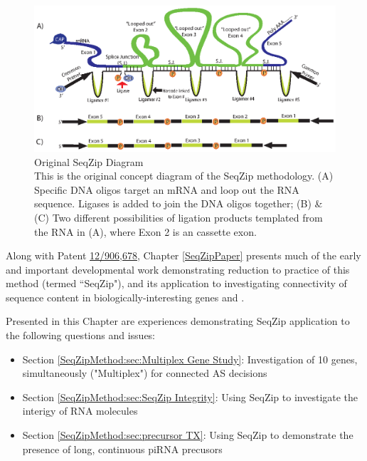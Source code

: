   \begin{figure} %
    \centering 
    \includegraphics{Figures/SeqZipMethod/OriginalSeqZipDiagram.eps}
    \caption[Original SeqZip Diagram]
    {
      Original SeqZip Diagram\\[0.25cm]
      This is the original concept diagram of the SeqZip methodology. (A) Specific DNA oligos target an mRNA and loop out the RNA sequence. Ligases is added to join the DNA oligos together; (B) \& (C) Two different possibilities of ligation products templated from the RNA in (A), where Exon 2 is an cassette exon.
    	}
    \label{SeqZipMethod:fig:Original SeqZip Diagram}
  	\end{figure}

  Along with Patent \href{http://1.usa.gov/PTG9BB}{12/906,678}, Chapter \ref{SeqZipPaper} presents much of the early and important developmental work demonstrating reduction to practice of this method (termed ``SeqZip"), and its application to investigating connectivity of sequence content in biologically-interesting genes \fn{} and \dscam{}. 

  Presented in this Chapter are experiences demonstrating SeqZip application to the following questions and issues:

  \begin{itemize} %
    \item Section \ref{SeqZipMethod:sec:Multiplex Gene Study}: Investigation of 10 genes, simultaneously ("Multiplex") for connected AS decisions
    \item Section \ref{SeqZipMethod:sec:SeqZip Integrity}: Using SeqZip to investigate the interigy of RNA molecules
    \item Section \ref{SeqZipMethod:sec:precursor TX}: Using SeqZip to demonstrate the presence of long, continuous piRNA precusors
	  \end{itemize}

